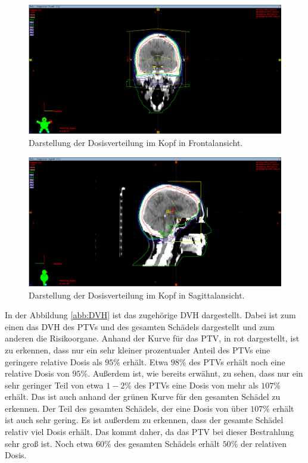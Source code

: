 \begin{figure}[H]
  \centering
  \includegraphics[width=\textwidth]{Bilder/Hirn_y.png}
  \caption{Darstellung der Dosisverteilung im Kopf in Frontalansicht.}
  \label{abb:Y}
\end{figure}

\begin{figure}[H]
  \centering
  \includegraphics[width=\textwidth]{Bilder/Hirn_x.png}
  \caption{Darstellung der Dosisverteilung im Kopf in Sagittalansicht.}
  \label{abb:X}
\end{figure}

In der Abbildung \ref{abb:DVH} ist das zugehörige DVH dargestellt. Dabei ist zum einen das DVH des PTVs und des gesamten Schädels dargestellt und zum
anderen die Risikoorgane.
Anhand der Kurve für das PTV, in rot dargestellt, ist zu erkennen, dass nur ein sehr kleiner prozentualer Anteil des PTVs eine geringere relative Dosis als
$95\%$ erhält. Etwa $98\%$ des PTVs erhält noch eine relative Dosis von $95\%$.
Außerdem ist, wie bereits erwähnt, zu sehen, dass nur ein sehr geringer Teil von etwa $1-2\%$ des PTVs eine Dosis von mehr als $107\%$ erhält.
Das ist auch anhand der grünen Kurve für den gesamten Schädel zu erkennen. Der Teil des gesamten Schädels, der eine Dosis von über $107\%$ erhält ist
auch sehr gering. Es ist außerdem zu erkennen, dass der gesamte Schädel relativ viel Dosis erhält. Das kommt daher, da das PTV bei dieser Bestrahlung sehr
groß ist. Noch etwa $60\%$ des gesamten Schädels erhält $50\%$ der relativen Dosis.


